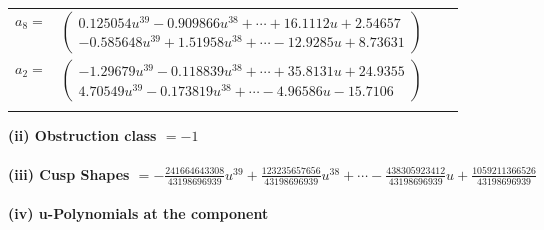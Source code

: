 \documentclass[1p]{elsarticle_modified}
\theoremstyle{definition}
\begin{document}
\begin{tabular}{m{7pt} m{180pt} m{7pt} m{180pt} }
\flushright $a_{8}=$&$\begin{pmatrix}0.125054 u^{39}-0.909866 u^{38}+\cdots+16.1112 u+2.54657\\-0.585648 u^{39}+1.51958 u^{38}+\cdots-12.9285 u+8.73631\end{pmatrix}$ \\
\flushright $a_{2}=$&$\begin{pmatrix}-1.29679 u^{39}-0.118839 u^{38}+\cdots+35.8131 u+24.9355\\4.70549 u^{39}-0.173819 u^{38}+\cdots-4.96586 u-15.7106\end{pmatrix}$\\&\end{tabular}
\flushleft \textbf{(ii) Obstruction class $= -1$}\\~\\
\flushleft \textbf{(iii) Cusp Shapes $= -\frac{241664643308}{43198696939} u^{39}+\frac{123235657656}{43198696939} u^{38}+\cdots-\frac{438305923412}{43198696939} u+\frac{1059211366526}{43198696939}$}\\~\\
\newpage\renewcommand{\arraystretch}{1}
\flushleft \textbf{(iv) u-Polynomials at the component}\newline \\
\end{document}
